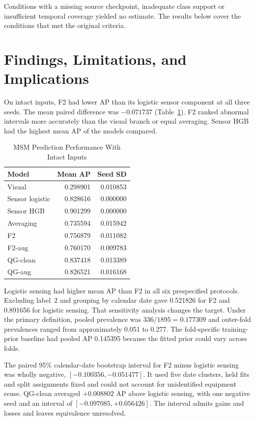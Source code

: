 Conditions with a missing source checkpoint, inadequate class support or insufficient temporal coverage yielded no estimate. The results below cover the conditions that met the original criteria.

\section{Findings, Limitations, and Implications}
On intact inputs, F2 had lower AP than its logistic sensor component at all three seeds. The mean paired difference was $-0.071737$ (Table~\ref{tab:msm-clean}). F2 ranked abnormal intervals more accurately than the visual branch or equal averaging. Sensor HGB had the highest mean AP of the models compared.

\begin{table}[htbp]
\caption{MSM Prediction Performance With Intact Inputs}\label{tab:msm-clean}
\centering\small

\begin{tabular}{lrr}\hline Model&Mean AP&Seed SD\\\hline
Visual&0.298901&0.010853\\
Sensor logistic&0.828616&0.000000\\
Sensor HGB&0.901299&0.000000\\
Averaging&0.735594&0.015942\\
F2&0.756879&0.011082\\
F2-aug&0.760170&0.009783\\
QG-clean&0.837418&0.013389\\
QG-aug&0.826521&0.016168\\\hline
\end{tabular}
\end{table}

Logistic sensing had higher mean AP than F2 in all six prespecified protocols. Excluding label~2 and grouping by calendar date gave 0.521826 for F2 and 0.891656 for logistic sensing. That sensitivity analysis changes the target. Under the primary definition, pooled prevalence was $336/1895=0.177309$ and outer-fold prevalences ranged from approximately 0.051 to 0.277. The fold-specific training-prior baseline had pooled AP 0.145395 because the fitted prior could vary across folds.

The paired 95\% calendar-date bootstrap interval for F2 minus logistic sensing was wholly negative, $[-0.100356,-0.051477]$. It used five date clusters, held fits and split assignments fixed and could not account for unidentified equipment reuse. QG-clean averaged $+0.008802$ AP above logistic sensing, with one negative seed and an interval of $[-0.097085,+0.056426]$. The interval admits gains and losses and leaves equivalence unresolved.

